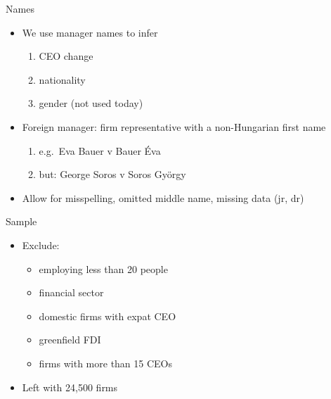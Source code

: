 \documentclass[
  ignorenonframetext,
  aspectratio=43,
]{beamer}
\providecommand{\tightlist}{%
  \setlength{\itemsep}{0pt}\setlength{\parskip}{0pt}}
\begin{document}
\begin{frame}{Names}
\protect\hypertarget{names}{}
\begin{itemize}
\tightlist
\item
  We use manager names to infer

  \begin{enumerate}
  \tightlist
  \item
    CEO change
  \item
    nationality
  \item
    gender (not used today)
  \end{enumerate}
\item
  Foreign manager: firm representative with a non-Hungarian first name

  \begin{enumerate}
  \tightlist
  \item
    e.g.~Eva Bauer v Bauer Éva
  \item
    but: George Soros v Soros György
  \end{enumerate}
\item
  Allow for misspelling, omitted middle name, missing data (jr, dr)
\end{itemize}
\end{frame}

\begin{frame}{Sample}
\protect\hypertarget{sample}{}
\begin{itemize}
\tightlist
\item
  Exclude:

  \begin{itemize}
  \tightlist
  \item
    employing less than 20 people
  \item
    financial sector
  \item
    domestic firms with expat CEO
  \item
    greenfield FDI
  \item
    firms with more than 15 CEOs
  \end{itemize}
\item
  Left with 24,500 firms
\end{itemize}
\end{frame}
\end{document}
